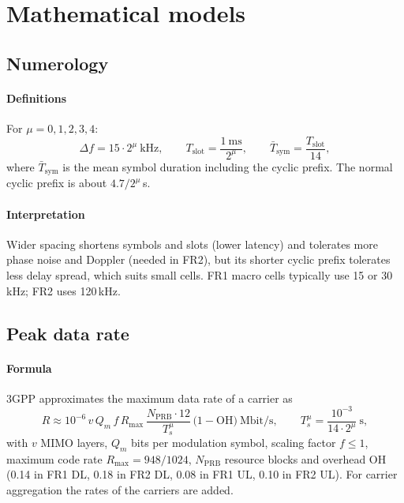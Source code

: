 \documentclass[11pt,a4paper]{article}
\begin{document}
\section{Mathematical models}

\subsection{Numerology}\label{sec:num}
\paragraph{Definitions} For $\mu = 0,1,2,3,4$:
\begin{equation}\label{eq:numerology}
  \Delta f = 15\cdot2^{\mu}\ \text{kHz}, \qquad
  T_{\mathrm{slot}} = \frac{1\ \text{ms}}{2^{\mu}}, \qquad
  \bar T_{\mathrm{sym}} = \frac{T_{\mathrm{slot}}}{14},
\end{equation}
where $\bar T_{\mathrm{sym}}$ is the mean symbol duration including the cyclic prefix. The normal cyclic prefix is
about $4.7/2^\mu$\,\textmu s.
\paragraph{Interpretation} Wider spacing shortens symbols and slots (lower latency) and tolerates more phase
noise and Doppler (needed in FR2), but its shorter cyclic prefix tolerates less delay spread, which suits small
cells. FR1 macro cells typically use 15 or 30\,kHz; FR2 uses 120\,kHz.

\subsection{Peak data rate}\label{sec:peak}
\paragraph{Formula} 3GPP approximates the maximum data rate of a carrier as \cite{ts38306}
\begin{equation}\label{eq:peak}
  R \approx 10^{-6}\, v\, Q_m\, f\, R_{\max}\,
          \frac{N_{\mathrm{PRB}}\cdot 12}{T_s^{\mu}}\,\bigl(1-\mathrm{OH}\bigr)\ \text{Mbit/s},
  \qquad T_s^{\mu} = \frac{10^{-3}}{14\cdot2^{\mu}}\ \text{s},
\end{equation}
with $v$ MIMO layers, $Q_m$ bits per modulation symbol, scaling factor $f\le1$, maximum code rate
$R_{\max} = 948/1024$, $N_{\mathrm{PRB}}$ resource blocks and overhead OH (0.14 in FR1 DL, 0.18 in FR2 DL, 0.08 in FR1
UL, 0.10 in FR2 UL). For carrier aggregation the rates of the carriers are added.
\end{document}
